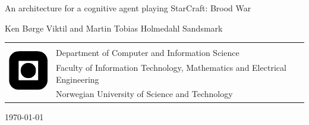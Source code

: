 \documentclass[a4paper, 12pt]{report}
\title{\papertitle}
\author{\authors}
\def \authors {Ken B\o{}rge Viktil and Martin Tobias Holmedahl Sandsmark}
\def \papertitle {An architecture for a cognitive agent playing StarCraft:
Brood War}
\begin{document}
\begin{titlepage}
\begin{center}
\vspace*{2cm}
\huge{\papertitle}

\vspace{.5cm}
\large{\authors}

\vspace{12cm}
\end{center}
\normalsize
\begin{table}[!h]
\begin{tabular}{ll}
\multirow{4}{*}{\includegraphics[width=20mm]{graphics/logo.png}} & \\
& Department of Computer and Information Science \\
& Faculty of Information Technology, Mathematics and Electrical Engineering \\
& Norwegian University of Science and Technology \\
\end{tabular}
\end{table}
\vspace{.5cm}
\begin{center}
\today
\end{center}
\end{titlepage}
\newpage
\thispagestyle{empty}
\mbox{}

\begin{abstract}
We present an overview of existing research into the use of cognitive models
for artificial intelligence, the game Starcraft: Broodwar, and research into
architectures for artificial intelligence programs for playing the game.
\end{abstract}


\tableofcontents






\printbibliography

\appendix

\end{document}
